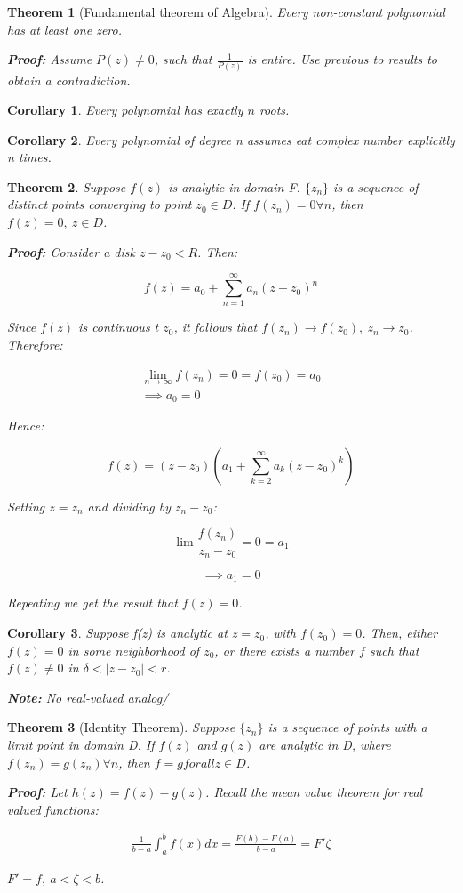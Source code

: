 \documentclass{article}
\newtheorem{theorem}{Theorem}[section]
\newtheorem{corollary}{Corollary}
\theoremstyle{definition}
\begin{document}
\begin{theorem}[Fundamental theorem of Algebra]
Every non-constant polynomial has at least one zero.

\textbf{Proof:}
Assume $P(z) \neq 0$, such that $\frac{1}{P(z)}$ is entire. Use previous to results to obtain a contradiction.
\end{theorem}
\begin{corollary}
Every polynomial has exactly $n$ roots.
\end{corollary}
\begin{corollary}
Every polynomial of degree n assumes eat complex number explicitly n times.
\end{corollary}
\begin{theorem}
Suppose $f(z)$ is analytic in domain F. $\{z_n\}$ is a sequence of distinct points converging to point $z_0 \in D$. If $f(z_n) = 0 \forall n$, then $f(z) = 0,\ z \in D$. 

\textbf{Proof:}
Consider a disk $z-z_0 < R$. Then:

$$f(z) = a_0 + \sum_{n=1}^\infty a_n (z-z_0)^n$$

Since $f(z)$ is continuous t $z_0$, it follows that $f(z_n) \to f(z_0),\ z_n \to z_0$. Therefore:

\begin{align}
\lim_{n\to\infty}f(z_n) = 0 = f(z_0) = a_0\\
\implies a_0=0
\end{align}

Hence:

$$f(z) = (z-z_0) \left(a_1 + \sum_{k=2}^\infty a_k (z-z_0)^k\right)$$

Setting $z = z_n$ and dividing by $z_n - z_0$:

$$\lim \frac{f(z_n)}{z_n-z_0} = 0 = a_1$$

$$\implies a_1 = 0$$

Repeating we get the result that $f(z) = 0$.
\end{theorem}

\begin{corollary}
Suppose f(z) is analytic at $z=z_0$, with $f(z_0) = 0$. Then, either $f(z) = 0$ in some neighborhood of $z_0$, or there exists a number $f$ such that $f(z) \neq 0$ in $\delta < |z-z_0| < r$. 

\textbf{Note:} No real-valued analog/
\end{corollary}
\begin{theorem}[Identity Theorem]
Suppose $\{z_n\}$ is a sequence of points with a limit point in domain D. If $f(z)$ and $g(z)$ are analytic in D, where $f(z_n) = g(z_n) \forall n$, then  $f=g forall z \in D$. 

\textbf{Proof:}
Let $h(z) = f(z) - g(z)$. Recall the mean value theorem for real valued functions:

\begin{align}
\frac{1}{b-a} \int_{a}^{b} f(x) dx = \frac{F(b)-F(a)}{b-a} = F'{\zeta}
\end{align}

$F' = f,\ a < \zeta < b$. 
\end{theorem}
\end{document}
